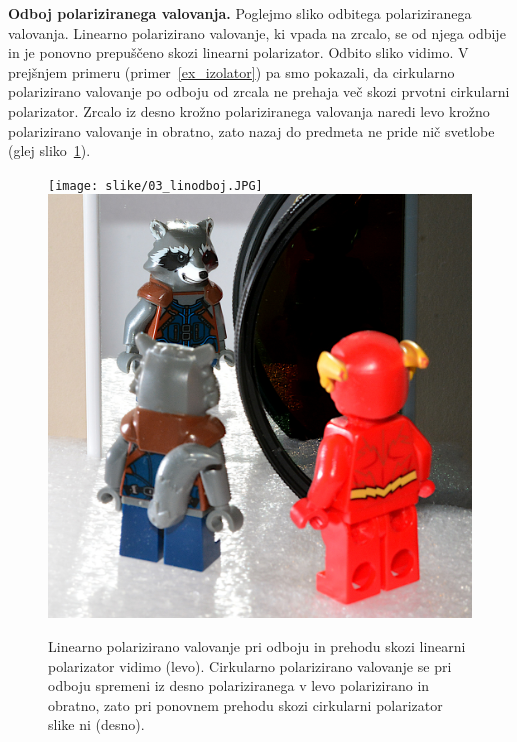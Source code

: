 \begin{example}{\bf Odboj polariziranega valovanja.}
Poglejmo sliko odbitega polariziranega valovanja. Linearno polarizirano
valovanje, ki vpada na zrcalo, se od njega odbije in je ponovno
prepuščeno skozi linearni polarizator. Odbito sliko vidimo. 
V prejšnjem primeru (primer~\ref{ex_izolator})
pa smo pokazali, da cirkularno polarizirano valovanje po odboju 
od zrcala ne prehaja več skozi prvotni cirkularni 
polarizator. Zrcalo iz desno krožno polariziranega valovanja naredi
levo krožno polarizirano valovanje in obratno, zato nazaj do predmeta
ne pride nič svetlobe (glej sliko~\ref{fig:03_CirkularniOdboj}). 
\begin{figure}[h!]
\centering
\texttt{[image: slike/03\_linodboj.JPG]}\hfill
\includegraphics[width=7truecm]{slike/03_circodboj.JPG}
\caption{Linearno polarizirano valovanje pri odboju in prehodu skozi linearni polarizator
vidimo (levo). Cirkularno polarizirano valovanje se pri odboju spremeni iz 
desno polariziranega v levo polarizirano in obratno, zato pri ponovnem 
prehodu skozi cirkularni polarizator slike ni (desno).}
\label{fig:03_CirkularniOdboj}
\end{figure}
\end{example}

